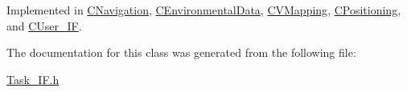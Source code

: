 Implemented in \mbox{\hyperlink{class_c_navigation_a3cc8f7fdd003d6b2c5056b87ff93edd9}{C\+Navigation}}, \mbox{\hyperlink{class_c_environmental_data_a61a8f487f013602aab4dadcf8a9da4c8}{C\+Environmental\+Data}}, \mbox{\hyperlink{class_c_v_mapping_ad4e34f79b444109d0cbf1223881126dc}{C\+V\+Mapping}}, \mbox{\hyperlink{class_c_positioning_a2706c9bb6bb52201c279386fd2c9dd89}{C\+Positioning}}, and \mbox{\hyperlink{class_c_user___i_f_ae241b3296f4dd7810897ed8631ede880}{C\+User\+\_\+\+IF}}.



The documentation for this class was generated from the following file\+:\begin{DoxyCompactItemize}
\item 
\mbox{\hyperlink{_task___i_f_8h}{Task\+\_\+\+I\+F.\+h}}\end{DoxyCompactItemize}
